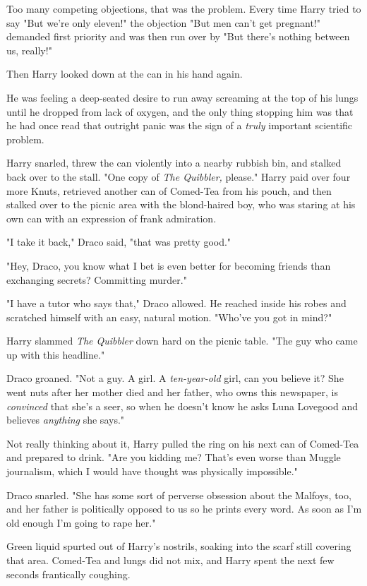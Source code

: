 Too many competing objections, that was the problem. Every time Harry tried to 
say "But we're only eleven!" the objection "But men can't get pregnant!" 
demanded first priority and was then run over by "But there's nothing between 
us, really!"

Then Harry looked down at the can in his hand again.

He was feeling a deep-seated desire to run away screaming at the top of his 
lungs until he dropped from lack of oxygen, and the only thing stopping him was 
that he had once read that outright panic was the sign of a \emph{truly} 
important scientific problem.

Harry snarled, threw the can violently into a nearby rubbish bin, and stalked 
back over to the stall. "One copy of \emph{The Quibbler,} please." Harry paid 
over four more Knuts, retrieved another can of Comed-Tea from his pouch, and 
then stalked over to the picnic area with the blond-haired boy, who was staring 
at his own can with an expression of frank admiration.

"I take it back," Draco said, "that was pretty good."

"Hey, Draco, you know what I bet is even better for becoming friends than 
exchanging secrets? Committing murder."

"I have a tutor who says that," Draco allowed. He reached inside his robes and 
scratched himself with an easy, natural motion. "Who've you got in mind?"

Harry slammed \emph{The Quibbler} down hard on the picnic table. "The guy who 
came up with this headline."

Draco groaned. "Not a guy. A girl. A \emph{ten-year-old} girl, can you believe 
it? She went nuts after her mother died and her father, who owns this 
newspaper, is \emph{convinced} that she's a seer, so when he doesn't know he 
asks Luna Lovegood and believes \emph{anything} she says."

Not really thinking about it, Harry pulled the ring on his next can of 
Comed-Tea and prepared to drink. "Are you kidding me? That's even worse than 
Muggle journalism, which I would have thought was physically impossible."

Draco snarled. "She has some sort of perverse obsession about the Malfoys, too, 
and her father is politically opposed to us so he prints every word. As soon as 
I'm old enough I'm going to rape her."

Green liquid spurted out of Harry's nostrils, soaking into the scarf still 
covering that area. Comed-Tea and lungs did not mix, and Harry spent the next 
few seconds frantically coughing.

